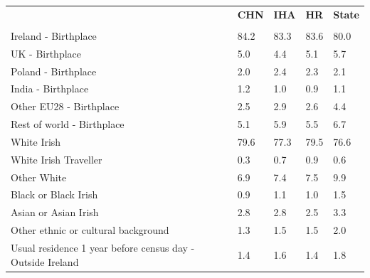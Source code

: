 \documentclass{article}
\begin{document}
\pagebreak
\begin{table}[h]	
\centering
		\begin{tabular}{KTTTT}
  \hline
& \textbf{CHN} & \textbf{IHA} & \textbf{HR}& \textbf{State}\\ 
  \hline
    \\ 
    \hline
Ireland - Birthplace & 84.2& 83.3& 83.6& 80.0\\
UK - Birthplace & 5.0& 4.4& 5.1& 5.7\\
Poland - Birthplace & 2.0& 2.4& 2.3& 2.1\\
India - Birthplace & 1.2& 1.0& 0.9& 1.1\\
Other EU28 - Birthplace & 2.5& 2.9& 2.6& 4.4\\
Rest of world - Birthplace & 5.1& 5.9& 5.5& 6.7\\
    \hline
White Irish & 79.6& 77.3& 79.5& 76.6\\
White Irish Traveller & 0.3& 0.7& 0.9& 0.6\\
Other White & 6.9& 7.4& 7.5& 9.9\\
Black or Black Irish & 0.9& 1.1& 1.0& 1.5\\
Asian or Asian Irish & 2.8& 2.8& 2.5& 3.3\\
Other ethnic or cultural background & 1.3& 1.5& 1.5& 2.0\\
    \hline
Usual residence 1 year before census day - Outside Ireland & 1.4& 1.6& 1.4& 1.8\\


\end{tabular}
\end{table}
\end{document}
